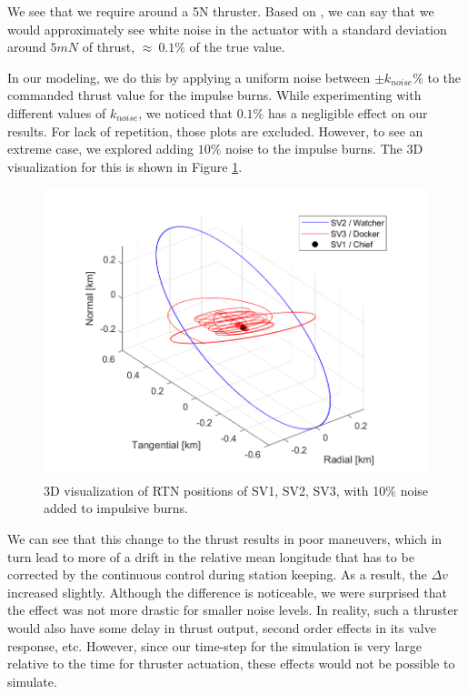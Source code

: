 We see that we require around a 5N thruster. Based on \cite{polk2013recommended}, we can say that we would approximately see white noise in the actuator with a standard deviation around $5 mN$ of thrust, $\approx~0.1\%$ of the true value.

In our modeling, we do this by applying a uniform noise between $\pm k_{noise} \%$ to the commanded thrust value for the impulse burns. While experimenting with different values of $k_{noise}$, we noticed that $0.1\%$ has a negligible effect on our results. For lack of repetition, those plots are excluded. However, to see an extreme case, we explored adding $10\%$ noise to the impulse burns. The 3D visualization for this is shown in Figure \ref{fig:3d_vis_with_act_noise}.

\begin{figure}[H]
    \centering
    \includegraphics[width=0.75\linewidth]{sim/figures/PS9/ROE_3d_all_maneuvers_act_noise.png}
    \caption{3D visualization of RTN positions of SV1, SV2, SV3, with 10\% noise added to impulsive burns.}
    \label{fig:3d_vis_with_act_noise}
\end{figure}

We can see that this change to the thrust results in poor maneuvers, which in turn lead to more of a drift in the relative mean longitude that has to be corrected by the continuous control during station keeping. As a result, the $\Delta v$ increased slightly. Although the difference is noticeable, we were surprised that the effect was not more drastic for smaller noise levels.
In reality, such a thruster would also have some delay in thrust output, second order effects in its valve response, etc. However, since our time-step for the simulation is very large relative to the time for thruster actuation, these effects would not be possible to simulate.

